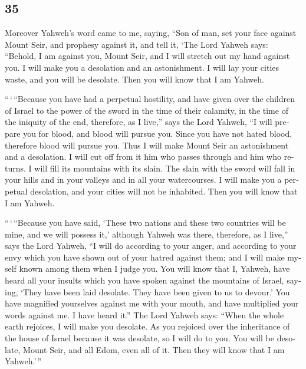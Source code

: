 \begin{paracol}{2}
\switchcolumn
\begin{otherlanguage}{english}

\hypertarget{section-69}{%
\section{35}\label{section-69}}

 Moreover Yahweh's word came to me, saying, 
``Son of man, set your face against Mount Seir, and prophesy against it,
 and tell it, `The Lord Yahweh says: ``Behold, I am
against you, Mount Seir, and I will stretch out my hand against you. I
will make you a desolation and an astonishment.  I will
lay your cities waste, and you will be desolate. Then you will know that
I am Yahweh.

 ``\,`\,``Because you have had a perpetual hostility, and
have given over the children of Israel to the power of the sword in the
time of their calamity, in the time of the iniquity of the end,
 therefore, as I live,'' says the Lord Yahweh, ``I will
prepare you for blood, and blood will pursue you. Since you have not
hated blood, therefore blood will pursue you.  Thus I will
make Mount Seir an astonishment and a desolation. I will cut off from it
him who passes through and him who returns.  I will fill
its mountains with its slain. The slain with the sword will fall in your
hills and in your valleys and in all your watercourses.  I
will make you a perpetual desolation, and your cities will not be
inhabited. Then you will know that I am Yahweh.

 ``\,`\,``Because you have said, `These two nations and
these two countries will be mine, and we will possess it,' although
Yahweh was there,  therefore, as I live,'' says the Lord
Yahweh, ``I will do according to your anger, and according to your envy
which you have shown out of your hatred against them; and I will make
myself known among them when I judge you.  You will know
that I, Yahweh, have heard all your insults which you have spoken
against the mountains of Israel, saying, `They have been laid desolate.
They have been given to us to devour.'  You have
magnified yourselves against me with your mouth, and have multiplied
your words against me. I have heard it.''  The Lord
Yahweh says: ``When the whole earth rejoices, I will make you desolate.
 As you rejoiced over the inheritance of the house of
Israel because it was desolate, so I will do to you. You will be
desolate, Mount Seir, and all Edom, even all of it. Then they will know
that I am Yahweh.'\,''


\end{otherlanguage}
\end{paracol}
